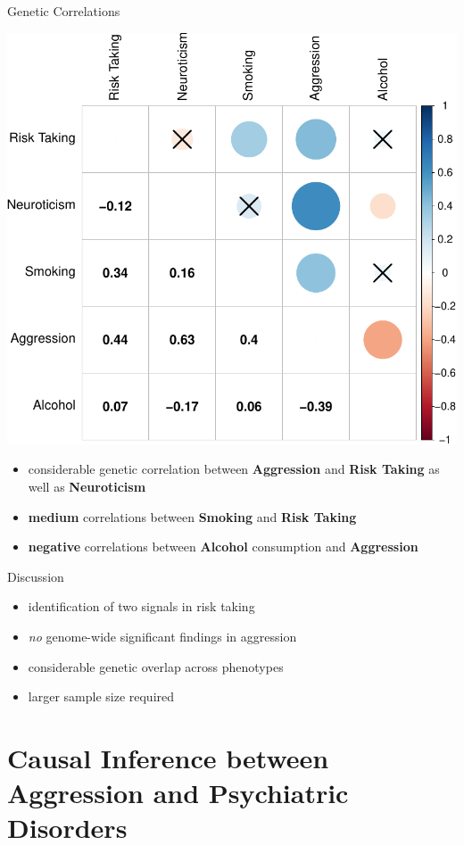 \documentclass{beamer}
\begin{document}
\begin{frame}[t]{Genetic Correlations}
  \tiny
  \begin{center}
    \includegraphics[width=0.6\linewidth]{../ukb_assoc/figure/genetic_corr/gcorr_plot_circle_full_se.pdf}
  \end{center}
  \begin{itemize}
    \item considerable genetic correlation between \textbf{Aggression} and \textbf{Risk Taking} as well as \textbf{Neuroticism}
    \item \textbf{medium} correlations between \textbf{Smoking} and \textbf{Risk Taking}
    \item \textbf{negative} correlations between \textbf{Alcohol} consumption and \textbf{Aggression}
  \end{itemize}
\end{frame}

\begin{frame}[t]{Discussion}
  \begin{itemize}
    \item identification of two signals in risk taking
    \item \textit{no} genome-wide significant findings in aggression
    \item considerable genetic overlap across phenotypes
    \item larger sample size required
  \end{itemize} 
\end{frame}

\section{Causal Inference between Aggression and Psychiatric Disorders}
\end{document}
